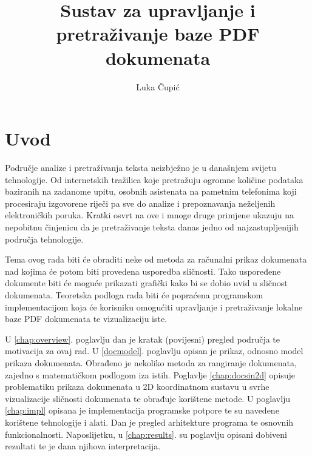 \documentclass[times, utf8, zavrsni, numeric]{fer}
\begin{document}

\title{Sustav za upravljanje i pretraživanje baze PDF dokumenata}

\author{Luka Čupić}

\maketitle

\izvornik

\zahvala{}

\tableofcontents

\chapter{Uvod}
Područje analize i pretraživanja teksta neizbježno je u današnjem svijetu tehnologije. Od internetskih tražilica koje pretražuju ogromne količine podataka baziranih na zadanome upitu, osobnih asistenata na pametnim telefonima koji procesiraju izgovorene riječi pa sve do analize i prepoznavanja neželjenih elektroničkih poruka.
Kratki osvrt na ove i mnoge druge primjene ukazuju na nepobitnu činjenicu da je pretraživanje teksta danas jedno od najzastupljenijih područja tehnologije.

Tema ovog rada biti će obraditi neke od metoda za računalni prikaz dokumenata nad kojima će potom biti provedena usporedba sličnosti. Tako uspoređene dokumente biti će moguće prikazati grafički kako bi se dobio uvid u sličnost dokumenata. Teoretska podloga rada biti će popraćena programskom implementacijom koja će korisniku omogućiti upravljanje i pretraživanje lokalne baze PDF dokumenata te vizualizaciju iste.

U \ref{chap:overview}. poglavlju dan je kratak (povijesni) pregled područja te motivacija za ovaj rad. U \ref{docmodel}. poglavlju opisan je prikaz, odnosno model prikaza dokumenata. Obrađeno je nekoliko metoda za rangiranje dokumenata, zajedno s matematičkom podlogom iza istih. Poglavlje \ref{chap:docsin2d} opisuje problematiku prikaza dokumenata u 2D koordinatnom sustavu u svrhe vizualizacije sličnosti dokumenata te obrađuje korištene metode. U poglavlju \ref{chap:impl} opisana je implementacija programske potpore te su navedene korištene tehnologije i alati. Dan je pregled arhitekture programa te osnovnih funkcionalnosti. Naposlijetku, u \ref{chap:results}. su poglavlju opisani dobiveni rezultati te je dana njihova interpretacija.
\end{document}
